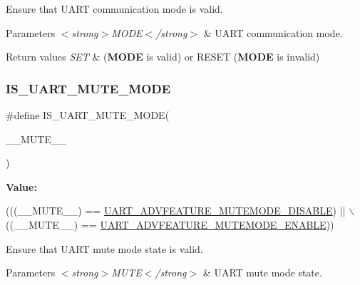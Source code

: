 Ensure that U\+A\+RT communication mode is valid. 


\begin{DoxyParams}{Parameters}
{\em $<$strong$>$\+M\+O\+D\+E$<$/strong$>$} & U\+A\+RT communication mode. \\
\hline
\end{DoxyParams}

\begin{DoxyRetVals}{Return values}
{\em S\+ET} & ({\bfseries M\+O\+DE} is valid) or R\+E\+S\+ET ({\bfseries M\+O\+DE} is invalid) \\
\hline
\end{DoxyRetVals}
\mbox{\label{group___u_a_r_t___private___macros_ga9df22e11f8bc82847fbe16b6f073ae04}} 
\subsubsection{\texorpdfstring{I\+S\+\_\+\+U\+A\+R\+T\+\_\+\+M\+U\+T\+E\+\_\+\+M\+O\+DE}{IS\_UART\_MUTE\_MODE}}
{\footnotesize\ttfamily \#define I\+S\+\_\+\+U\+A\+R\+T\+\_\+\+M\+U\+T\+E\+\_\+\+M\+O\+DE(\begin{DoxyParamCaption}\item[{}]{\+\_\+\+\_\+\+M\+U\+T\+E\+\_\+\+\_\+ }\end{DoxyParamCaption})}

{\bfseries Value\+:}
\begin{DoxyCode}
(((\_\_MUTE\_\_) == \hyperlink{group___u_a_r_t___mute___mode_ga11b6414641d82b941920c291e19aa042}{UART\_ADVFEATURE\_MUTEMODE\_DISABLE}) || \(\backslash\)
                                           ((\_\_MUTE\_\_) == 
      \hyperlink{group___u_a_r_t___mute___mode_gaa9ca3763538abf310102ac34e81cdcbc}{UART\_ADVFEATURE\_MUTEMODE\_ENABLE}))
\end{DoxyCode}


Ensure that U\+A\+RT mute mode state is valid. 


\begin{DoxyParams}{Parameters}
{\em $<$strong$>$\+M\+U\+T\+E$<$/strong$>$} & U\+A\+RT mute mode state. \\
\hline
\end{DoxyParams}

